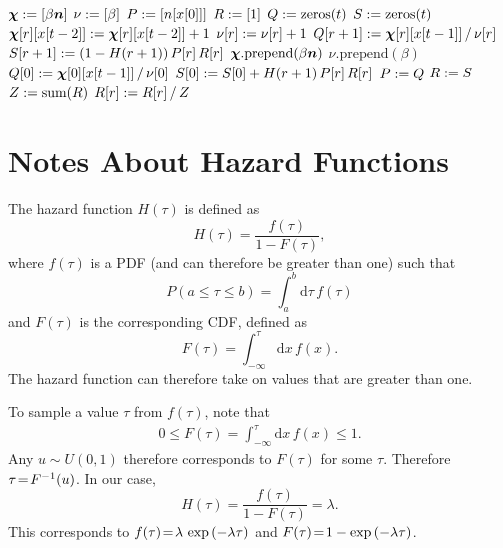 \documentclass[10pt,english,oneside]{article}
\begin{document}
\begin{algorithm}[t]
  \caption[]{}
  \label{alg:inference2}
  \begin{algorithmic}[0]
    \State {}
    \Statex
    \State $\boldsymbol{\chi} := [\beta \boldsymbol{n}]$
    \State $\nu := [ \beta]$
    \State $P := [n[x[0]]]$
    \State $R := [ 1 ]$
    \Statex
    \State {}
    \Statex
    \State $Q := \textrm{zeros}(t)$
    \State $S := \textrm{zeros}(t)$
    \State $\boldsymbol{\chi}[r][x[t-2]] := \boldsymbol{\chi}[r][x[t-2]] + 1$
    \State $\nu[r] := \nu[r] + 1$
    \State $Q[r+1] := \boldsymbol{\chi}[r][x[t-1]] \,/\, \nu[r]$
    \State $S[r+1] := (1 - H(r+1))\,P[r]\,R[r]$
    \EndFor
    \State $\boldsymbol{\chi}.\textrm{prepend}(\beta \boldsymbol{n})$
    \State $\nu.\textrm{prepend}(\beta)$
    \State $Q[0] := \boldsymbol{\chi}[0][x[t-1]] \,/\, \nu[0]$
    \State $S[0] := S[0] +
    H(r+1)\,P[r]\,R[r]$
    \EndFor
    \State $P := Q$
    \State $R := S$
    \State $Z := \textrm{sum}(R)$
    \Statex
    \State {}
    \Statex
    \State $R[r] := R[r] \,/\, Z$
    \EndFor
    \Statex
    \State {}
    \Statex
    \EndFor
  \end{algorithmic}
\end{algorithm}

\section{Notes About Hazard Functions}

The hazard function $H(\tau)$ is defined as
\begin{equation}
  H(\tau) = \frac{f(\tau)}{1 - F(\tau)},
\end{equation}
where
$f(\tau)$ is a PDF (and can therefore be greater than one) such that
\begin{equation}
  P(a \leq \tau \leq b) = \int_a^b \textrm{d}\tau \, f(\tau)
\end{equation}
and $F(\tau)$ is the corresponding CDF, defined as
\begin{equation}
  F(\tau) = \int_{-\infty}^{\tau} \textrm{d}x\, f(x).
\end{equation}
The hazard function can therefore take on values that are greater than
one.

To sample a value $\tau$ from $f(\tau)$, note that
\begin{align}
  0 \leq F(\tau) = \int_{- \infty}^{\tau} \textrm{d}x \, f(x) \leq 1.
\end{align}
Any $u \sim U(0,1)$ therefore corresponds to $F(\tau)$ for some
$\tau$. Therefore $\tau \!=\! F^{-1}(u)$. In our case,
\begin{equation}
  H(\tau) = \frac{f(\tau)}{1 - F(\tau)} = \lambda.
\end{equation}
This corresponds to $f(\tau) \!=\! \lambda\,\exp{(-\lambda \tau)}$ and
$F(\tau) \!=\! 1 - \exp{(-\lambda \tau)}$.


\end{document}
